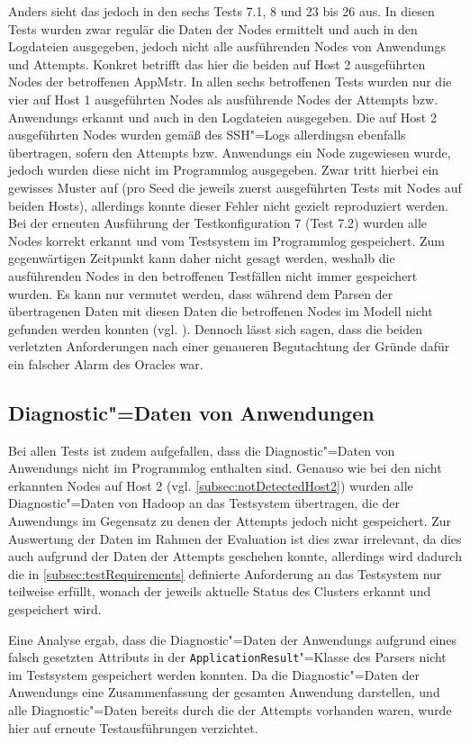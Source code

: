 Anders sieht das jedoch in den sechs \glspl{Test} 7.1, 8 und 23 bis 26 aus.
In diesen \glspl{Test} wurden zwar regulär die Daten der Nodes ermittelt und auch in den Logdateien ausgegeben, jedoch nicht alle ausführenden Nodes von \glspl{Anwendung} und Attempts.
Konkret betrifft das hier die beiden auf Host 2 ausgeführten Nodes der betroffenen \gls{AppMstr}.
In allen sechs betroffenen \glspl{Test} wurden nur die vier auf Host 1 ausgeführten Nodes als ausführende Nodes der \glspl{Attempt} bzw. \glspl{Anwendung} erkannt und auch in den Logdateien ausgegeben.
Die auf Host 2 ausgeführten Nodes wurden gemäß des SSH"=Logs allerdingsn ebenfalls übertragen, sofern den \glspl{Attempt} bzw. \glspl{Anwendung} ein Node zugewiesen wurde, jedoch wurden diese nicht im Programmlog ausgegeben.
Zwar tritt hierbei ein gewisses Muster auf (pro Seed die jeweils zuerst ausgeführten \glspl{Test} mit Nodes auf beiden Hosts), allerdings konnte dieser Fehler nicht gezielt reproduziert werden.
Bei der erneuten Ausführung der \gls{Testkonfiguration} 7 (Test 7.2) wurden alle Nodes korrekt erkannt und vom Testsystem im Programmlog gespeichert.
Zum gegenwärtigen Zeitpunkt kann daher nicht gesagt werden, weshalb die ausführenden Nodes in den betroffenen Testfällen nicht immer gespeichert wurden.
Es kann nur vermutet werden, dass während dem Parsen der übertragenen Daten mit diesen Daten die betroffenen Nodes im Modell nicht gefunden werden konnten (vgl. ).
Dennoch lässt sich sagen, dass die beiden verletzten Anforderungen nach einer genaueren Begutachtung der Gründe dafür ein falscher Alarm des Oracles war.

\subsection{Diagnostic"=Daten von Anwendungen}
\label{subsec:notSavedAppDiagnostics}

Bei allen \glspl{Test} ist zudem aufgefallen, dass die Diagnostic"=Daten von \glspl{Anwendung} nicht im Programmlog enthalten sind.
Genauso wie bei den nicht erkannten Nodes auf Host 2 (vgl. \cref{subsec:notDetectedHost2}) wurden alle Diagnostic"=Daten von Hadoop an das Testsystem übertragen, die der \glspl{Anwendung} im Gegensatz zu denen der \glspl{Attempt} jedoch nicht gespeichert.
Zur Auswertung der Daten im Rahmen der Evaluation ist dies zwar irrelevant, da dies auch aufgrund der Daten der \glspl{Attempt} geschehen konnte, allerdings wird dadurch die in \cref{subsec:testRequirements} definierte Anforderung an das Testsystem nur teilweise erfüllt, wonach der jeweils aktuelle Status des Clusters erkannt und gespeichert wird.

Eine Analyse ergab, dass die Diagnostic"=Daten der \glspl{Anwendung} aufgrund eines falsch gesetzten Attributs in der \texttt{ApplicationResult}"=Klasse des Parsers nicht im Testsystem gespeichert werden konnten. 
Da die Diagnostic"=Daten der \glspl{Anwendung} eine Zusammenfassung der gesamten \gls{Anwendung} darstellen, und alle Diagnostic"=Daten bereits durch die der \glspl{Attempt} vorhanden waren, wurde hier auf erneute Testausführungen verzichtet.
